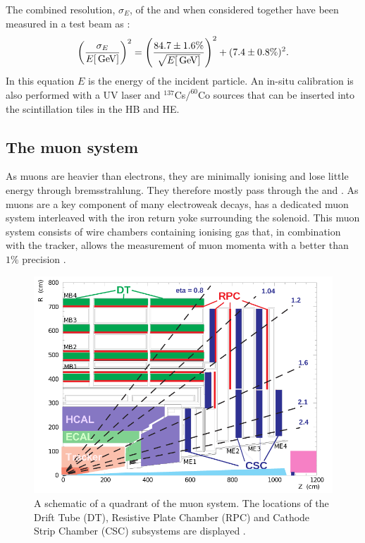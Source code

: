 The combined resolution, $\sigma_E$, of the \ECAL and \HCAL when
considered together have been measured in a test beam as
\cite{Abdullin:2008zzb}: 
\begin{equation} \label{eq:hcalres}
\left(\frac{\sigma_E}{E[\mathrm{\,Ge\kern -0.1em V}]}\right)^2=\left(\frac{84.7\pm1.6\%}
{\sqrt{E[\mathrm{\,Ge\kern -0.1em V}]}}\right)^2+(7.4\pm0.8\%)^2.  
\end{equation} 
In this equation $E$ is the energy of the incident particle. An
in-situ calibration is also performed with a UV laser and
$^{137}$Cs$/^{60}$Co sources that can be inserted into the scintillation
tiles in the \ac{HB} and \ac{HE}.

\subsection{The muon system} 

As muons are heavier than electrons, they are minimally ionising and
lose little energy through bremsstrahlung. They therefore mostly pass
through the \ECAL and \HCAL. As muons are a key component of many
electroweak decays, \CMS has a dedicated muon system interleaved with
the iron return yoke surrounding the solenoid. This muon system
consists of wire chambers containing ionising gas that, in combination
with the tracker, allows the measurement of muon momenta with a
better than $1\%$ precision \cite{CMS:1997dma}.

\begin{figure}
\begin{center}
\includegraphics[width=0.8\linewidth]{figs/cms_muon} \end{center}
\caption{ A schematic of a quadrant of the \CMS muon system. The
locations of the Drift Tube (DT), Resistive Plate Chamber (RPC) and
Cathode Strip Chamber (CSC) subsystems are displayed
\cite{Kim:2012ix}.}
\label{fig:muon} \end{figure}

